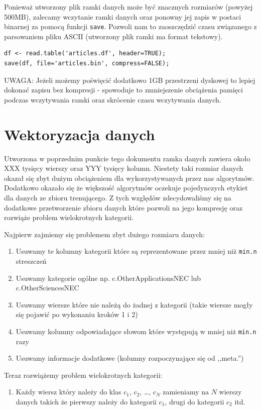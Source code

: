 \documentclass[a4paper,12pt]{article}
\begin{document}
		Ponieważ utworzony plik ramki danych może być znacznych rozmiarów
		(powyżej 500MB), zalecamy wczytanie ramki danych oraz ponowny 
		jej zapis w postaci binarnej za pomocą funkcji \texttt{save}.
		Pozwoli nam to zaoszczędzić czasu związanego z parsowaniem
		pliku ASCII (utworzony plik ramki ma format tekstowy).
		\begin{verbatim}
df <- read.table('articles.df', header=TRUE);
save(df, file='articles.bin', compress=FALSE);
		\end{verbatim}		
				
		\textsc{UWAGA}: Jeżeli możemy poświęcić dodatkowo 1GB przestrzeni
		dyskowej to lepiej dokonać zapisu bez kompresji - spowoduje to
		zmniejszenie obciążenia pamięci podczas wczytywania ramki oraz
		skrócenie czasu wczytywania danych.
	
\section{Wektoryzacja danych}
		Utworzona w poprzednim punkcie tego dokumentu ramka danych
		zawiera około XXX tysięcy wierszy oraz YYY tysięcy kolumn.
		Niestety taki rozmiar danych okazał się zbyt dużym obciążeniem
		dla wykorzystywanych przez nas algorytmów. Dodatkowo okazało się
		że większość algorytmów oczekuje pojedynczych etykiet dla danych
		ze zbioru trenującego. Z tych względów zdecydowaliśmy się 
		na dodatkowe przetworzenie zbioru danych które pozwoli na jego
		kompresję oraz rozwiąże problem wielokrotnych kategorii.
		
		Najpierw zajmiemy się problemem zbyt dużego rozmiaru danych:
		\begin{enumerate}
			\item
				Usuwamy te kolumny kategorii które są reprezentowane
				przez mniej niż \texttt{min.n} streszczeń
			\item
				Usuwamy kategorie ogólne np. c.OtherApplicationsNEC lub
				c.OtherSciencesNEC
			\item
				Usuwamy wiersze które nie należą do żadnej z kategorii
				(takie wiersze mogły się pojawić po wykonaniu kroków 1 i 2)
			\item
				Usuwamy kolumny odpowiadające słowom które występują
				w mniej niż \texttt{min.n} razy
			\item
				Usuwamy informacje dodatkowe (kolumny rozpoczynające się
				od ,,meta.'')
		\end{enumerate}
		
		Teraz rozwiążemy problem wielokrotnych kategorii:
		\begin{enumerate}
			\item
				Każdy wiersz który należy do klas $c_1$, $c_2$, \ldots, $c_N$
				zamieniamy na $N$ wierszy danych takich że pierwszy należy
				do kategorii $c_1$, drugi do kategorii $c_2$ itd.
		\end{enumerate}
		
\end{document}
